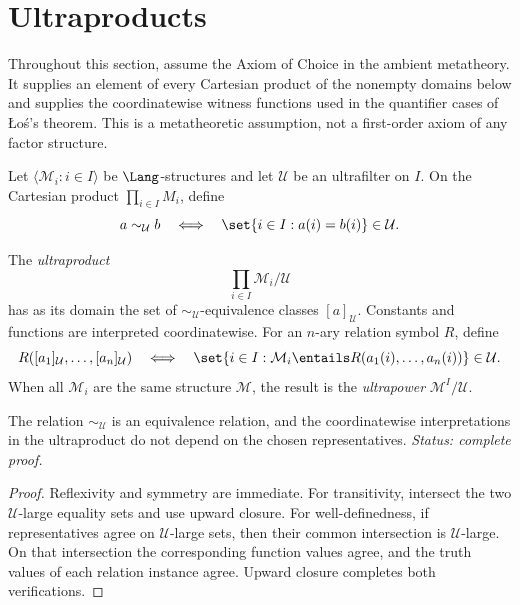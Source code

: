\section{Ultraproducts}
\label{sec:types-ultraproducts-05}

Throughout this section, assume the Axiom of Choice in the ambient
metatheory.  It supplies an element of every Cartesian product of the
nonempty domains below and supplies the coordinatewise witness functions used
in the quantifier cases of \L o\'s's theorem.  This is a metatheoretic
assumption, not a first-order axiom of any factor structure.

Let \(\langle\mathcal M_i:i\in I\rangle\) be \(\Lang\)-structures and let
\(\mathcal U\) be an ultrafilter on \(I\).  On the Cartesian product
\(\prod_{i\in I}M_i\), define
\[
  a\sim_{\mathcal U}b
  \quad\Longleftrightarrow\quad
  \set{i\in I:a(i)=b(i)}\in\mathcal U.
\]

\begin{definition}[Ultraproduct]
The \emph{ultraproduct}
\[
  \prod_{i\in I}\mathcal M_i/\mathcal U
\]
has as its domain the set of \(\sim_{\mathcal U}\)-equivalence classes
\([a]_{\mathcal U}\).  Constants and functions are interpreted
coordinatewise.  For an \(n\)-ary relation symbol \(R\), define
\[
  R([a_1]_{\mathcal U},\ldots,[a_n]_{\mathcal U})
  \quad\Longleftrightarrow\quad
  \set{i\in I:\mathcal M_i\entails R(a_1(i),\ldots,a_n(i))}
  \in\mathcal U.
\]
When all \(\mathcal M_i\) are the same structure \(\mathcal M\), the result is
the \emph{ultrapower} \(\mathcal M^I/\mathcal U\).
\end{definition}

\begin{lemma}
The relation \(\sim_{\mathcal U}\) is an equivalence relation, and the
coordinatewise interpretations in the ultraproduct do not depend on the
chosen representatives.
\textit{Status: complete proof.}
\end{lemma}

\begin{proof}
Reflexivity and symmetry are immediate.  For transitivity, intersect the two
\(\mathcal U\)-large equality sets and use upward closure.  For
well-definedness, if representatives agree on \(\mathcal U\)-large sets, then
their common intersection is \(\mathcal U\)-large.  On that intersection the
corresponding function values agree, and the truth values of each relation
instance agree.  Upward closure completes both verifications.
\end{proof}

